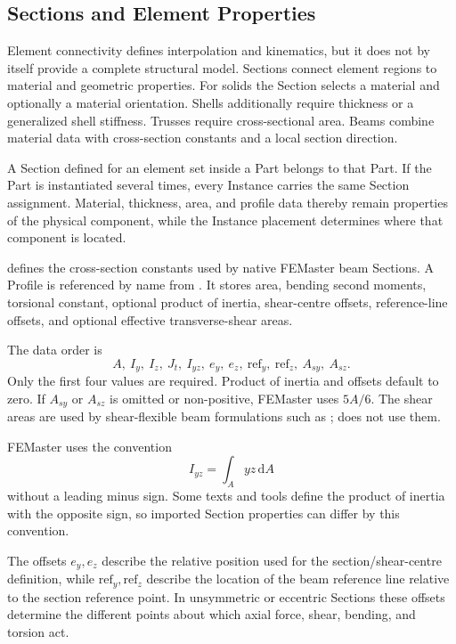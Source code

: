 \subsection{Sections and Element Properties}
\label{sec:sections}

Element connectivity defines interpolation and kinematics, but it does not by itself provide a complete structural model. Sections connect element regions to material and geometric properties. For solids the Section selects a material and optionally a material orientation. Shells additionally require thickness or a generalized shell stiffness. Trusses require cross-sectional area. Beams combine material data with cross-section constants and a local section direction.

A Section defined for an element set inside a Part belongs to that Part. If the Part is instantiated several times, every Instance carries the same Section assignment. Material, thickness, area, and profile data thereby remain properties of the physical component, while the Instance placement determines where that component is located.


 defines the cross-section constants used by native FEMaster beam Sections. A Profile is referenced by name from . It stores area, bending second moments, torsional constant, optional product of inertia, shear-centre offsets, reference-line offsets, and optional effective transverse-shear areas.

The data order is
\[
A,\ I_y,\ I_z,\ J_t,\ I_{yz},\ e_y,\ e_z,\ \mathrm{ref}_y,\ \mathrm{ref}_z,\ A_{sy},\ A_{sz}.
\]
Only the first four values are required. Product of inertia and offsets default to zero. If \(A_{sy}\) or \(A_{sz}\) is omitted or non-positive, FEMaster uses \(5A/6\). The shear areas are used by shear-flexible beam formulations such as ;  does not use them.

FEMaster uses the convention
\[
I_{yz}=\int_A yz\,\mathrm dA
\]
without a leading minus sign. Some texts and tools define the product of inertia with the opposite sign, so imported Section properties can differ by this convention.

The offsets \(e_y,e_z\) describe the relative position used for the section/shear-centre definition, while \(\mathrm{ref}_y,\mathrm{ref}_z\) describe the location of the beam reference line relative to the section reference point. In unsymmetric or eccentric Sections these offsets determine the different points about which axial force, shear, bending, and torsion act.

